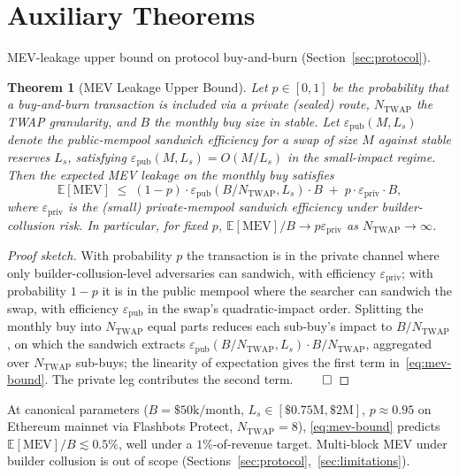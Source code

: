 \documentclass[11pt,a4paper]{article}
\theoremstyle{plain}
\newtheorem{theorem}{Theorem}
\theoremstyle{definition}
\theoremstyle{remark}
\newcommand{\Ls}{L_s}              %
\begin{document}
\section{Auxiliary Theorems}
\label{app:auxiliary}

MEV-leakage upper bound on protocol buy-and-burn (Section~\ref{sec:protocol}).

\begin{theorem}[MEV Leakage Upper Bound]
\label{thm:mev-bound}
Let $p \in [0, 1]$ be the probability that a buy-and-burn transaction is included via a private (sealed) route, $N_{\text{TWAP}}$ the TWAP granularity, and $B$ the monthly buy size in stable. Let $\varepsilon_{\text{pub}}(M, \Ls)$ denote the public-mempool sandwich efficiency for a swap of size $M$ against stable reserves $\Ls$, satisfying $\varepsilon_{\text{pub}}(M, \Ls) = O(M/\Ls)$ in the small-impact regime. Then the expected MEV leakage on the monthly buy satisfies
\begin{equation}
\mathbb{E}[\mathrm{MEV}] \;\leq\; (1 - p) \cdot \varepsilon_{\text{pub}}(B/N_{\text{TWAP}}, \Ls) \cdot B \;+\; p \cdot \varepsilon_{\text{priv}} \cdot B,
\label{eq:mev-bound}
\end{equation}
where $\varepsilon_{\text{priv}}$ is the (small) private-mempool sandwich efficiency under builder-collusion risk. In particular, for fixed $p$, $\mathbb{E}[\mathrm{MEV}]/B \to p \varepsilon_{\text{priv}}$ as $N_{\text{TWAP}} \to \infty$.
\end{theorem}

\begin{proof}[Proof sketch]
With probability $p$ the transaction is in the private channel where only builder-collusion-level adversaries can sandwich, with efficiency $\varepsilon_{\text{priv}}$; with probability $1 - p$ it is in the public mempool where the searcher can sandwich the swap, with efficiency $\varepsilon_{\text{pub}}$ in the swap's quadratic-impact order. Splitting the monthly buy into $N_{\text{TWAP}}$ equal parts reduces each sub-buy's impact to $B/N_{\text{TWAP}}$, on which the sandwich extracts $\varepsilon_{\text{pub}}(B/N_{\text{TWAP}}, \Ls) \cdot B/N_{\text{TWAP}}$, aggregated over $N_{\text{TWAP}}$ sub-buys; the linearity of expectation gives the first term in~\eqref{eq:mev-bound}. The private leg contributes the second term. $\qed$
\end{proof}

At canonical parameters ($B = \$50\text{k}/\text{month}$, $\Ls \in [\$0.75\text{M}, \$2\text{M}]$, $p \approx 0.95$ on Ethereum mainnet via Flashbots Protect, $N_{\text{TWAP}} = 8$), \eqref{eq:mev-bound} predicts $\mathbb{E}[\mathrm{MEV}]/B \lesssim 0.5\%$, well under a $1\%$-of-revenue target. Multi-block MEV under builder collusion is out of scope (Sections~\ref{sec:protocol},~\ref{sec:limitations}).
\end{document}
